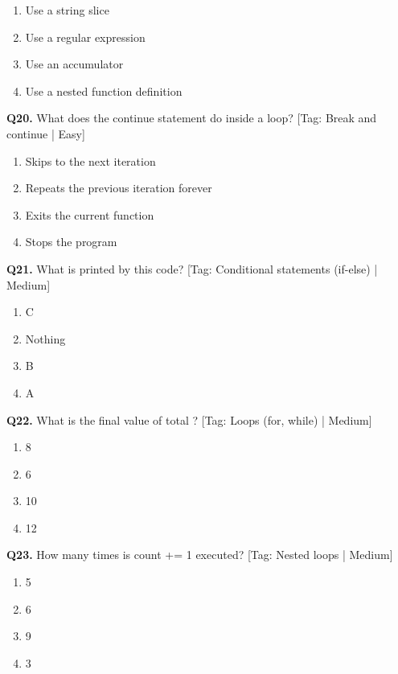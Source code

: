 \begin{enumerate}[label=(\alph*),topsep=2pt,itemsep=1pt,partopsep=0pt,parsep=0pt]
    \item {Use a string slice}
    \item {Use a regular expression}
    \item {Use an accumulator}
    \item {Use a nested function definition}
\end{enumerate}
\vspace{2mm}
\noindent\textbf{Q20.} What does the continue statement do inside a loop? \hfill [Tag: Break and continue | Easy]
\begin{enumerate}[label=(\alph*),topsep=2pt,itemsep=1pt,partopsep=0pt,parsep=0pt]
    \item {Skips to the next iteration}
    \item {Repeats the previous iteration forever}
    \item {Exits the current function}
    \item {Stops the program}
\end{enumerate}
\vspace{2mm}
\noindent\textbf{Q21.} What is printed by this code? \hfill [Tag: Conditional statements (if-else) | Medium]
\begin{enumerate}[label=(\alph*),topsep=2pt,itemsep=1pt,partopsep=0pt,parsep=0pt]
    \item {C}
    \item {Nothing}
    \item {B}
    \item {A}
\end{enumerate}
\vspace{2mm}
\noindent\textbf{Q22.} What is the final value of total ? \hfill [Tag: Loops (for, while) | Medium]
\begin{enumerate}[label=(\alph*),topsep=2pt,itemsep=1pt,partopsep=0pt,parsep=0pt]
    \item {8}
    \item {6}
    \item {10}
    \item {12}
\end{enumerate}
\vspace{2mm}
\noindent\textbf{Q23.} How many times is count += 1 executed? \hfill [Tag: Nested loops | Medium]
\begin{enumerate}[label=(\alph*),topsep=2pt,itemsep=1pt,partopsep=0pt,parsep=0pt]
    \item {5}
    \item {6}
    \item {9}
    \item {3}
\end{enumerate}
